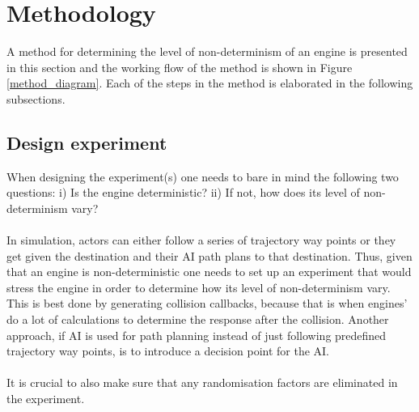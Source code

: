 \section{Methodology} \label{method}
\noindent A method for determining the level of non-determinism of an engine is presented in this section and the working flow of the method is shown in Figure \ref{method_diagram}. Each of the steps in the method is elaborated in the following subsections.

\subsection{Design experiment}
\noindent When designing the experiment(s) one needs to bare in mind the following two questions: i) Is the engine deterministic? ii) If not, how does its level of non-determinism vary?\\\\
In simulation, actors can either follow a series of trajectory way points or they get given the destination and their AI path plans to that destination. 
Thus, given that an engine is non-deterministic one needs to set up an experiment that would stress the engine in order to determine how its level of non-determinism vary. This is best done by generating collision callbacks, because that is when engines' do a lot of calculations to determine the response after the collision. Another approach, if AI is used for path planning instead of just following predefined trajectory way points, is to introduce a decision point for the AI.\\\\
It is crucial to also make sure that any randomisation factors are eliminated in the experiment.

